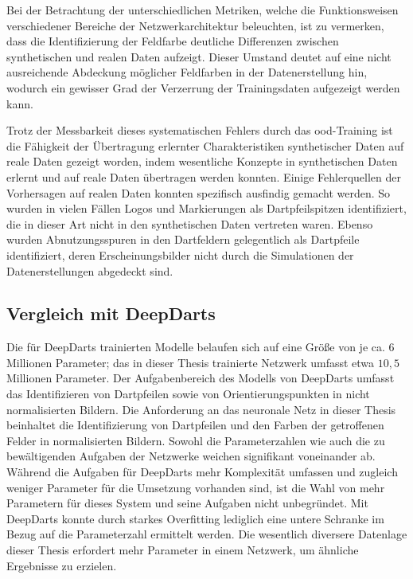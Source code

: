 Bei der Betrachtung der unterschiedlichen Metriken, welche die Funktionsweisen verschiedener Bereiche der Netzwerkarchitektur beleuchten, ist zu vermerken, dass die Identifizierung der Feldfarbe deutliche Differenzen zwischen synthetischen und realen Daten aufzeigt. Dieser Umstand deutet auf eine nicht ausreichende Abdeckung möglicher Feldfarben in der Datenerstellung hin, wodurch ein gewisser Grad der Verzerrung der Trainingsdaten aufgezeigt werden kann.

Trotz der Messbarkeit dieses systematischen Fehlers durch das \ac{ood}-Training ist die Fähigkeit der Übertragung erlernter Charakteristiken synthetischer Daten auf reale Daten gezeigt worden, indem wesentliche Konzepte in synthetischen Daten erlernt und auf reale Daten übertragen werden konnten. Einige Fehlerquellen der Vorhersagen auf realen Daten konnten spezifisch ausfindig gemacht werden. So wurden in vielen Fällen Logos und Markierungen als Dartpfeilspitzen identifiziert, die in dieser Art nicht in den synthetischen Daten vertreten waren. Ebenso wurden Abnutzungsspuren in den Dartfeldern gelegentlich als Dartpfeile identifiziert, deren Erscheinungsbilder nicht durch die Simulationen der Datenerstellungen abgedeckt sind.


\vspace*{-0.1cm}
\subsection{Vergleich mit DeepDarts}

Die für DeepDarts trainierten Modelle belaufen sich auf eine Größe von je ca. $6$ Millionen Parameter; das in dieser Thesis trainierte Netzwerk umfasst etwa $10,\!5$ Millionen Parameter. Der Aufgabenbereich des Modells von DeepDarts umfasst das Identifizieren von Dartpfeilen sowie von Orientierungspunkten in nicht normalisierten Bildern. Die Anforderung an das neuronale Netz in dieser Thesis beinhaltet die Identifizierung von Dartpfeilen und den Farben der getroffenen Felder in normalisierten Bildern. Sowohl die Parameterzahlen wie auch die zu bewältigenden Aufgaben der Netzwerke weichen signifikant voneinander ab. Während die Aufgaben für DeepDarts mehr Komplexität umfassen und zugleich weniger Parameter für die Umsetzung vorhanden sind, ist die Wahl von mehr Parametern für dieses System und seine Aufgaben nicht unbegründet. Mit DeepDarts konnte durch starkes Overfitting lediglich eine untere Schranke im Bezug auf die Parameterzahl ermittelt werden. Die wesentlich diversere Datenlage dieser Thesis erfordert mehr Parameter in einem Netzwerk, um ähnliche Ergebnisse zu erzielen.


